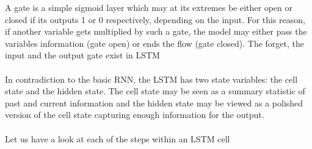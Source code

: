 \documentclass[a4paper,11pt,oneside]{book}
\begin{document}
A gate is a simple sigmoid layer which may at its extremes be either open or closed if its outputs 1 or 0 respectively, depending on the input. For this reason, if another variable gets multiplied by such a gate, the model may either pass the variables information (gate open) or ends the flow (gate closed). The forget, the input and the output gate exist in LSTM\\\\

In contradiction to the basic RNN, the LSTM has two state variables: the cell state and the hidden state. The cell state may be seen as a summary statistic of past and current  information and the hidden state may be viewed as a polished version of the cell state capturing enough information for the output.\\\\

Let us have a look at each of the steps within an LSTM cell
\end{document}
